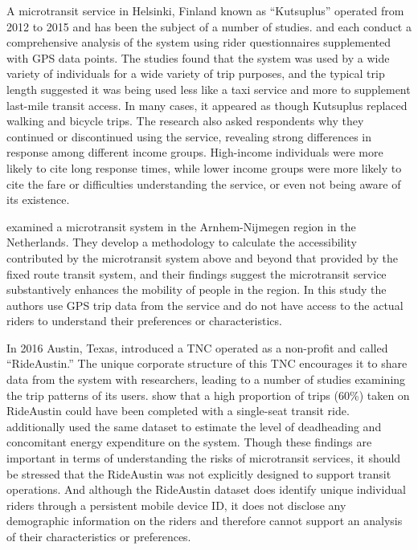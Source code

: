 \documentclass[smartcities,article,submit,moreauthors,pdftex]{Definitions/mdpi}
\begin{document}
A microtransit service in Helsinki, Finland known as “Kutsuplus” operated from 2012 to 2015 and has been the subject of a number of studies. \citet{weckstrom2018} and \citet{Haglund2019} each conduct a comprehensive analysis of the system using rider questionnaires supplemented with GPS data points. The studies found that the system was used by a wide variety of individuals for a wide variety of trip purposes, and the typical trip length suggested it was being used less like a taxi service and more to supplement last-mile transit access. In many cases, it appeared as though Kutsuplus replaced walking and bicycle trips. The \citeauthor{weckstrom2018} research also asked respondents why they continued or discontinued using the service, revealing strong differences in response among different income groups. High-income individuals were more likely to cite long response times, while lower income groups were more likely to cite the fare or difficulties understanding the service, or even not being aware of its existence.

\citet{alonso2018} examined a microtransit system in the Arnhem-Nijmegen region in the Netherlands. They develop a methodology to calculate the accessibility contributed by the microtransit system above and beyond that provided by the fixed route transit system, and their findings suggest the microtransit service substantively enhances the mobility of people in the region. In this study the authors use GPS trip data from the service and do not have access to the actual riders to understand their preferences or characteristics.

In 2016 Austin, Texas, introduced a TNC operated as a non-profit and called “RideAustin.” The unique corporate structure of this TNC encourages it to share data from the system with researchers, leading to a number of studies examining the trip patterns of its users. \citet{Komanduri2018} show that a high proportion of trips (60\%) taken on RideAustin could have been completed with a single-seat transit ride. \citet{Wenzel2019} additionally used the same dataset to estimate the level of deadheading and concomitant energy expenditure on the system. Though these findings are important in terms of understanding the risks of microtransit services, it should be stressed that the RideAustin was not explicitly designed to support transit operations. And although the RideAustin dataset does identify unique individual riders through a persistent mobile device ID, it does not disclose any demographic information on the riders and therefore cannot support an analysis of their characteristics or preferences.
\end{document}
